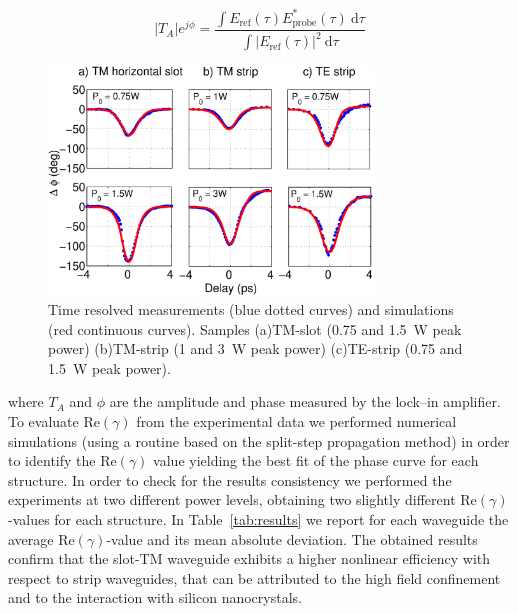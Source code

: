 \documentclass[10pt,letterpaper]{article}
\begin{document}
                                                                \begin{equation}
                                                                        |T_{A}|e^{j\phi} =
                                                                        \frac{\int E_{\mathrm{ref}}(\tau) E^*_{\mathrm{probe}}(\tau) ~ \mathrm{d}\tau}
                                                                        {\int |E_{\mathrm{ref}}(\tau)|^2~\mathrm{d}\tau}
                                                                \end{equation}


                                                                
\begin{figure}[htb]
  \centering
  \includegraphics[width=0.77\textwidth]{measurements_v9} %
  \caption{Time resolved measurements (blue dotted curves) and simulations (red continuous curves). Samples (a)TM-slot (0.75 and 1.5~W peak power) (b)TM-strip (1 and 3~W peak power) (c)TE-strip (0.75 and 1.5~W peak power).}
  \label{fig:timeResolvesMeasurements}
\end{figure}

where $T_A$ and $\phi$ are the amplitude and phase measured by the lock--in amplifier.
To evaluate Re$(\gamma)$ from the experimental data we performed numerical simulations (using a routine based on the split-step propagation method) in order to identify the Re$(\gamma)$ value yielding the best fit of the phase curve for each structure. In order to check for the results consistency we performed the experiments at two different power levels, obtaining two slightly different Re$(\gamma)$-values for each structure. In Table~\ref{tab:results} we report for each waveguide the average Re$(\gamma)$-value and its mean absolute deviation. 
The obtained results confirm that the slot-TM waveguide exhibits a higher nonlinear efficiency with respect to strip waveguides, that can be attributed to the high field confinement and to the interaction with silicon nanocrystals.
\end{document}
